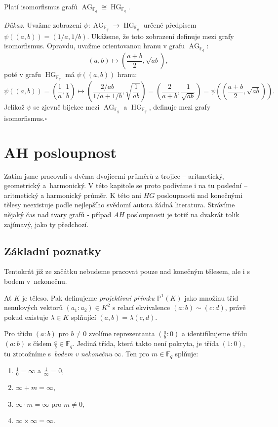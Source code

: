 \documentclass[12pt]{report}
\DeclareMathOperator{\AG}{AG}
\DeclareMathOperator{\HG}{HG}
\begin{document}
\begin{veta}
Platí isomorfismus grafů $\AG_{\mathbb{F}_q} \cong \HG_{\mathbb{F}_q}$.
\end{veta}
\noindent \textit{Důkaz.} Uvažme zobrazení $\psi : \AG_{\mathbb{F}_q} \longrightarrow \HG_{\mathbb{F}_q}$ určené předpisem $\psi((a,b)) = (1/a,1/b)$. Ukážeme, že toto zobrazení definuje mezi grafy isomorfismus. Opravdu, uvažme orientovanou hranu v grafu $\AG_{\mathbb{F}_q}$: 
$$(a,b) \longmapsto \left(\frac{a+b}{2}, \sqrt{ab} \right),$$
poté v grafu $\HG_{\mathbb{F}_q}$ má $\psi((a,b))$ hranu:
$$\psi ((a,b)) = \left(\frac{1}{a}, \frac{1}{b} \right) \longmapsto \left(\frac{2/ab}{1/a+1/b}, \sqrt{\frac{1}{ab}} \right) = \left( \frac{2}{a+b}, \frac{1}{\sqrt{ab}} \right) = \psi \left( \left( \frac{a+b}{2}, \sqrt{ab} \right) \right).$$
Jelikož $\psi$ se zjevně bijekce mezi $\AG_{\mathbb{F}_q}$ a $\HG_{\mathbb{F}_q}$, definuje mezi grafy isomorfismus.\hfill $\square$\\


\chapter{AH posloupnost}\label{AH}
Zatím jsme pracovali s dvěma dvojicemi průměrů z trojice -- aritmetický, geometrický a~harmonický. V této kapitole se proto podíváme i na tu poslední -- aritmetický a harmonický průměr. K této ani $HG$ posloupnosti nad konečnými tělesy neexistuje podle nejlepšího svědomí autora žádná literatura. Strávíme nějaký čas nad tvary grafů - případ $AH$ posloupnosti je totiž na dvakrát tolik zajímavý, jako ty předchozí.

\section{Základní poznatky}

Tentokrát již ze začátku nebudeme pracovat pouze nad konečným tělesem, ale i s bodem v~nekonečnu.

\begin{definice}
Ať $K$ je těleso. Pak definujeme \textit{projektivní přímku} $\mathbb{P}^{1} (K)$ jako množinu tříd nenulových vektorů $(a_1:a_2) \in K^2$ s relací ekvivalence $(a:b) \sim (c:d)$, právě pokud existuje $\lambda \in K$ splňující $(a,b) = \lambda (c,d)$.
\end{definice}
Pro třídu $(a:b)$ pro $b \neq 0$ zvolíme reprezentanta $\left(\frac{a}{b} : 0 \right)$ a identifikujeme třídu $(a:b)$ s číslem $\frac{a}{b} \in \mathbb{F}_q$. Jediná třída, která takto není pokryta, je třída $(1:0)$, tu ztotožníme s~\textit{bodem v nekonečnu} $\infty$. 
Ten pro $m \in \mathbb{F}_q$ splňuje:
\begin{enumerate}
\item $\frac{1}{0} = \infty$ a $\frac{1}{\infty} = 0$,
\item $\infty+m = \infty$,
\item $\infty \cdot m = \infty$ pro $m \neq 0$,
\item $\infty \times \infty = \infty$.
\end{enumerate}
\end{document}
